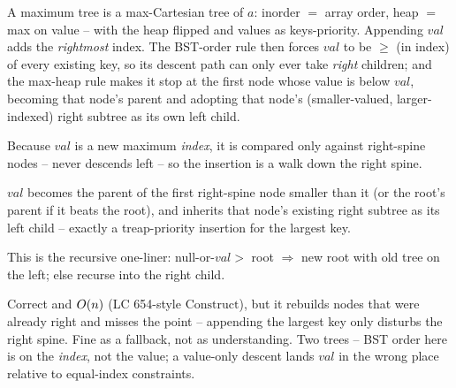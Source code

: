 A maximum tree is a max-Cartesian tree of $a$: inorder $=$ array order, heap $=$ max on value --
 with the heap flipped and values as keys-priority. Appending $\mathit{val}$
adds the \emph{rightmost} index. The BST-order rule then forces $\mathit{val}$ to be $\ge$ (in index) of
every existing key, so its descent path can only ever take \emph{right} children; and the max-heap rule
makes it stop at the first node whose value is below $\mathit{val}$, becoming that node's parent and
adopting that node's (smaller-valued, larger-indexed) right subtree as its own left child.

\begin{observation}
Because $\mathit{val}$ is a new maximum \emph{index}, it is compared only against right-spine nodes --
never descends left -- so the insertion is a walk down the right spine.
\end{observation}
\begin{observation}
$\mathit{val}$ becomes the parent of the first right-spine node smaller than it (or the root's parent if
it beats the root), and inherits that node's existing right subtree as its left child -- exactly a
treap-priority insertion for the largest key.
\end{observation}
\begin{observation}
This is the recursive one-liner: null-or-$\mathit{val}>$ root $\Rightarrow$ new root with old tree on the
left; else recurse into the right child.
\end{observation}

\begin{thinkbox}
{Correct and $O(n)$ (LC 654-style $\text{Construct}$), but it rebuilds nodes that were already right
and misses the point -- appending the largest key only disturbs the right spine. Fine as a fallback, not
as understanding.}
{Two trees -- BST order here is on the \emph{index}, not the value; a value-only descent lands $\mathit{val}$
in the wrong place relative to equal-index constraints.}
\end{thinkbox}

